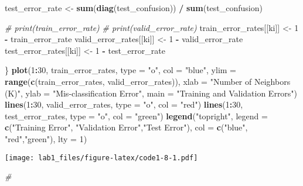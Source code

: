 \documentclass[
]{article}
\newenvironment{Shaded}{\begin{snugshade}}{\end{snugshade}}
\newcommand{\AttributeTok}[1]{\textcolor[rgb]{0.13,0.29,0.53}{#1}}
\newcommand{\CommentTok}[1]{\textcolor[rgb]{0.56,0.35,0.01}{\textit{#1}}}
\newcommand{\DecValTok}[1]{\textcolor[rgb]{0.00,0.00,0.81}{#1}}
\newcommand{\FunctionTok}[1]{\textcolor[rgb]{0.13,0.29,0.53}{\textbf{#1}}}
\newcommand{\NormalTok}[1]{#1}
\newcommand{\OtherTok}[1]{\textcolor[rgb]{0.56,0.35,0.01}{#1}}
\newcommand{\SpecialCharTok}[1]{\textcolor[rgb]{0.81,0.36,0.00}{\textbf{#1}}}
\newcommand{\StringTok}[1]{\textcolor[rgb]{0.31,0.60,0.02}{#1}}
\begin{document}
\begin{Shaded}
\begin{Highlighting}[]
\NormalTok{test\_error\_rate }\OtherTok{\textless{}{-}} \FunctionTok{sum}\NormalTok{(}\FunctionTok{diag}\NormalTok{(test\_confusion)) }\SpecialCharTok{/} \FunctionTok{sum}\NormalTok{(test\_confusion)}

\CommentTok{\# print(train\_error\_rate)}
\CommentTok{\# print(valid\_error\_rate)}
\NormalTok{train\_error\_rates[[ki]] }\OtherTok{\textless{}{-}} \DecValTok{1} \SpecialCharTok{{-}}\NormalTok{ train\_error\_rate}
\NormalTok{valid\_error\_rates[[ki]] }\OtherTok{\textless{}{-}} \DecValTok{1} \SpecialCharTok{{-}}\NormalTok{ valid\_error\_rate}
\NormalTok{test\_error\_rates[[ki]] }\OtherTok{\textless{}{-}} \DecValTok{1} \SpecialCharTok{{-}}\NormalTok{ test\_error\_rate}

\NormalTok{\}}
\FunctionTok{plot}\NormalTok{(}\DecValTok{1}\SpecialCharTok{:}\DecValTok{30}\NormalTok{, train\_error\_rates, }\AttributeTok{type =} \StringTok{"o"}\NormalTok{, }\AttributeTok{col =} \StringTok{"blue"}\NormalTok{, }\AttributeTok{ylim =} \FunctionTok{range}\NormalTok{(}\FunctionTok{c}\NormalTok{(train\_error\_rates, valid\_error\_rates)),}
 \AttributeTok{xlab =} \StringTok{"Number of Neighbors (K)"}\NormalTok{, }\AttributeTok{ylab =} \StringTok{"Mis{-}classification Error"}\NormalTok{, }\AttributeTok{main =} \StringTok{"Training and Validation Errors"}\NormalTok{)}
\FunctionTok{lines}\NormalTok{(}\DecValTok{1}\SpecialCharTok{:}\DecValTok{30}\NormalTok{, valid\_error\_rates, }\AttributeTok{type =} \StringTok{"o"}\NormalTok{, }\AttributeTok{col =} \StringTok{"red"}\NormalTok{)}
\FunctionTok{lines}\NormalTok{(}\DecValTok{1}\SpecialCharTok{:}\DecValTok{30}\NormalTok{, test\_error\_rates, }\AttributeTok{type =} \StringTok{"o"}\NormalTok{, }\AttributeTok{col =} \StringTok{"green"}\NormalTok{)}
\FunctionTok{legend}\NormalTok{(}\StringTok{"topright"}\NormalTok{, }\AttributeTok{legend =} \FunctionTok{c}\NormalTok{(}\StringTok{"Training Error"}\NormalTok{, }\StringTok{"Validation Error"}\NormalTok{,}\StringTok{"Test Error"}\NormalTok{), }\AttributeTok{col =} \FunctionTok{c}\NormalTok{(}\StringTok{"blue"}\NormalTok{, }\StringTok{"red"}\NormalTok{,}\StringTok{"green"}\NormalTok{), }\AttributeTok{lty =} \DecValTok{1}\NormalTok{)}
\end{Highlighting}
\end{Shaded}

\texttt{[image: lab1\_files/figure-latex/code1-8-1.pdf]}

\begin{Shaded}
\begin{Highlighting}[]
\CommentTok{\# }
\end{Highlighting}
\end{Shaded}
\end{document}
